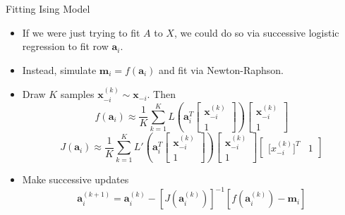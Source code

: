 \documentclass{beamer}
\begin{document}
\begin{frame}{Fitting Ising Model}
    \begin{itemize}
        \item If we were just trying to fit $A$ to $X$, we could do so via successive logistic regression to fit row $\mathbf a_i$.
        \item Instead, simulate $\mathbf m_i = f(\mathbf a_i)$ and fit via Newton-Raphson. 
        \item Draw $K$ samples $\mathbf x_{-i}^{(k)}\sim \mathbf x_{-i}$. Then
            \[f\left(\mathbf a_i\right) \approx \frac{1}{K}\sum_{k=1}^K L\left(\mathbf{a}_i^T\left[\begin{array}{c} \mathbf x_{-i}^{(k)} \\ 1 \end{array}\right]\right)\left[\begin{array}{c} \mathbf x_{-i}^{(k)} \\ 1 \end{array}\right] \]
            \[J\left( \mathbf a_i\right) \approx \frac{1}{K}\sum_{k=1}^K L'\left(\mathbf{a}_i^T\left[\begin{array}{c} \mathbf x_{-i}^{(k)} \\ 1 \end{array}\right]\right)\left[\begin{array}{c} \mathbf x_{-i}^{(k)} \\ 1 \end{array}\right]\left[\begin{array}{cc} \mathbf [x_{-i}^{(k)}]^T & 1 \end{array}\right] \]
        \item Make successive updates
            \[\mathbf a_i^{(k+1)} = \mathbf a_i^{(k)} - \left[J\left(\mathbf a_i^{(k)}\right) \right]^{-1}\left[f\left(\mathbf a_i^{(k)}\right)-\mathbf m_i\right] \]
    \end{itemize}
\end{frame}
\end{document}
